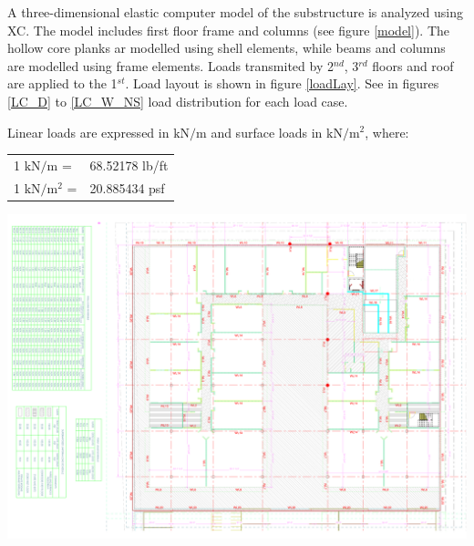 A three-dimensional elastic computer model of the substructure is analyzed using XC. The model includes first floor frame and columns (see figure \ref{model}). The hollow core planks ar modelled using shell elements, while beams and columns are modelled using frame elements. Loads transmited by 2$^{nd}$, 3$^{rd}$ floors and roof are applied to the 1$^{st}$. Load layout is shown in figure \ref{loadLay}. See in figures \ref{LC_D} to \ref{LC_W_NS} load distribution for each load case.

Linear loads are expressed in $\mathrm{kN/m}$ and surface loads in $\mathrm{kN/m^2}$, where:
\begin{center}
  \begin{tabular}{ll}
    1 $\mathrm{kN/m}$ = & 68.52178 lb/ft \\
    1 $\mathrm{kN/m^2}$ = & 20.885434 psf \\
  \end{tabular}
  \end{center}

\begin{Figure}
    \includegraphics[width=150mm]{figures/loads_layout}
    \label{loadLay}
\end{Figure}



